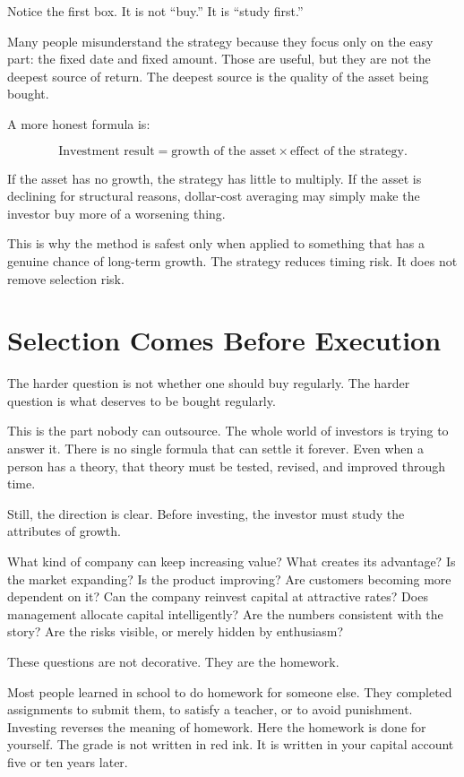Notice the first box. It is not ``buy.'' It is ``study first.''

Many people misunderstand the strategy because they focus only on the easy part: the fixed date and fixed amount. Those are useful, but they are not the deepest source of return. The deepest source is the quality of the asset being bought.

A more honest formula is:

\[
\text{Investment result}
=
\text{growth of the asset}
\times
\text{effect of the strategy}.
\]

If the asset has no growth, the strategy has little to multiply. If the asset is declining for structural reasons, dollar-cost averaging may simply make the investor buy more of a worsening thing.

This is why the method is safest only when applied to something that has a genuine chance of long-term growth. The strategy reduces timing risk. It does not remove selection risk.

\section*{Selection Comes Before Execution}

The harder question is not whether one should buy regularly. The harder question is what deserves to be bought regularly.

This is the part nobody can outsource. The whole world of investors is trying to answer it. There is no single formula that can settle it forever. Even when a person has a theory, that theory must be tested, revised, and improved through time.

Still, the direction is clear. Before investing, the investor must study the attributes of growth.

What kind of company can keep increasing value? What creates its advantage? Is the market expanding? Is the product improving? Are customers becoming more dependent on it? Can the company reinvest capital at attractive rates? Does management allocate capital intelligently? Are the numbers consistent with the story? Are the risks visible, or merely hidden by enthusiasm?

These questions are not decorative. They are the homework.

Most people learned in school to do homework for someone else. They completed assignments to submit them, to satisfy a teacher, or to avoid punishment. Investing reverses the meaning of homework. Here the homework is done for yourself. The grade is not written in red ink. It is written in your capital account five or ten years later.

